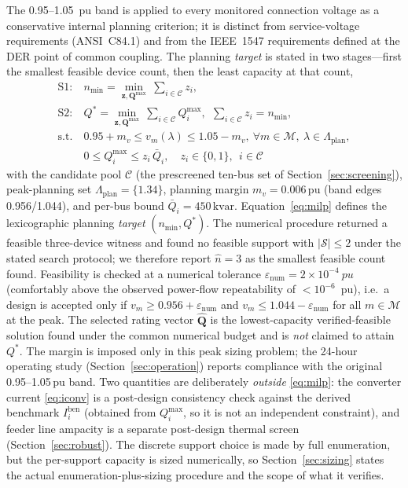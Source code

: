 \documentclass{ieeeaccess}
\newcommand{\num}[1]{#1}
\newcommand{\SI}[2]{#1\,\ensuremath{\mathrm{#2}}}
\newcommand{\numrange}[2]{#1\mbox{--}#2}
\newcommand{\SIrange}[3]{#1\mbox{--}#2\,\ensuremath{\mathrm{#3}}}
\newcommand{\kvar}{\text{kvar}}
\newcommand{\Qmax}{Q^{\max}}
\newcommand{\Iben}{I^{\mathrm{ben}}}
\begin{document}
The \numrange{0.95}{1.05}~pu band is applied to every monitored connection voltage
as a conservative internal planning criterion; it is distinct from service-voltage
requirements (ANSI~C84.1) and from the IEEE~1547 requirements defined at the DER
point of common coupling. The planning
\emph{target} is stated in two stages---first the smallest feasible device
count, then the least capacity at that count,
\begin{subequations}
\label{eq:milp}
\begin{align}
\text{S1:}\ & n_{\min} = \min_{\mathbf z,\mathbf Q^{\max}}\ \textstyle\sum_{i\in\mathcal C} z_i, \\
\text{S2:}\ & Q^\ast = \min_{\mathbf z,\mathbf Q^{\max}}\ \textstyle\sum_{i\in\mathcal C} \Qmax_i,\ \ \textstyle\sum_{i\in\mathcal C} z_i = n_{\min}, \\
\text{s.t.}\ & 0.95 + m_v \le v_m(\lambda) \le 1.05 - m_v, \
     \forall m\in\mathcal M,\ \lambda\in\Lambda_{\mathrm{plan}}, \\
   & 0 \le \Qmax_i \le z_i\,\bar Q_i, \quad z_i\in\{0,1\},\ \ i\in\mathcal C
\end{align}
\end{subequations}
with the candidate pool $\mathcal C$ (the prescreened ten-bus set of
Section~\ref{sec:screening}), peak-planning set $\Lambda_{\mathrm{plan}}=\{1.34\}$,
planning margin $m_v=\SI{0.006}{pu}$ (band edges \num{0.956}/\num{1.044}), and
per-bus bound $\bar Q_i=\SI{450}{\kvar}$. Equation~\eqref{eq:milp} defines the
lexicographic planning \emph{target} $(n_{\min},Q^\ast)$. The numerical procedure
returned a feasible three-device witness and found no feasible support with
$|\mathcal S|\le 2$ under the stated search protocol; we therefore report
$\hat n=3$ as the smallest feasible count found. Feasibility is checked at a
numerical tolerance $\varepsilon_{\mathrm{num}}=\ensuremath{2\times10^{-4}}~pu$ (comfortably above
the observed power-flow repeatability of $<10^{-6}$~pu), i.e.\ a design is accepted
only if $v_m\ge 0.956+\varepsilon_{\mathrm{num}}$ and
$v_m\le 1.044-\varepsilon_{\mathrm{num}}$ for all $m\in\mathcal M$ at the peak.
The selected rating vector $\hat{\mathbf Q}$ is the lowest-capacity
verified-feasible solution found under the common numerical budget and is
\emph{not} claimed to attain $Q^\ast$. The margin is
imposed only in this peak sizing problem; the 24-hour operating study
(Section~\ref{sec:operation}) reports compliance with the original
\SIrange{0.95}{1.05}{pu} band. Two quantities are deliberately \emph{outside}
\eqref{eq:milp}: the converter current \eqref{eq:iconv} is a post-design
consistency check against the derived benchmark $\Iben_i$ (obtained from $\Qmax_i$,
so it is not an independent constraint), and feeder line ampacity is a separate post-design
thermal screen (Section~\ref{sec:robust}). The discrete support choice is made by
full enumeration, but the per-support capacity is sized numerically, so
Section~\ref{sec:sizing} states the actual enumeration-plus-sizing procedure and
the scope of what it verifies.
\end{document}
